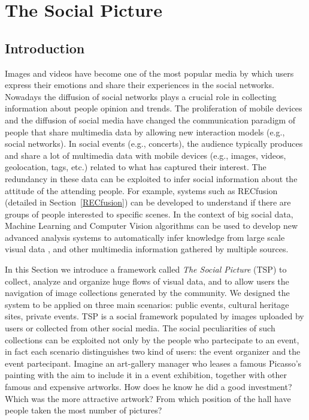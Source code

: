 \section{The Social Picture}\label{TSP}
\subsection{Introduction}
Images and videos have become one of the most popular media by which users express their emotions and share their experiences in the social networks. Nowadays the diffusion of social networks plays a crucial role in collecting information about people opinion and trends.
The proliferation of mobile devices and the diffusion of social media have changed the communication paradigm of people that share multimedia data by allowing new interaction models (e.g., social networks). In social events (e.g., concerts), the audience typically produces and share a lot of multimedia data with mobile devices (e.g., images, videos, geolocation, tags, etc.) related to what has captured their interest. The redundancy in these data can be exploited to infer social information about the attitude of the attending people. For example, systems such as RECfusion \cite{Ortis2015n525} (detailed in Section~\ref{RECfusion}) can be developed to understand if there are groups of people interested to specific scenes. In the context of big social data, Machine Learning and Computer Vision algorithms can be used to develop new advanced analysis systems to automatically infer knowledge from large scale visual data \cite{weyand2015visual}, and other multimedia information gathered by multiple sources.

In this Section we introduce a framework called \textit{The Social Picture} (TSP) to collect, analyze and organize huge flows of visual data, and to allow users the navigation of image collections generated by the community.
We designed the system to be applied on three main scenarios: public events, cultural heritage sites, private events. TSP is a social framework populated by images uploaded by users or collected from other social media. The social peculiarities of such collections can be exploited not only by the people who partecipate to an event, in fact each scenario distinguishes two kind of users: the event organizer and the event partecipant.
Imagine an art-gallery manager who leases a famous Picasso's painting with the aim to include it in a event exhibition, together with other famous and expensive artworks. How does he know he did a good investment? Which was the more attractive artwork? From which position of the hall have people taken the most number of pictures?

